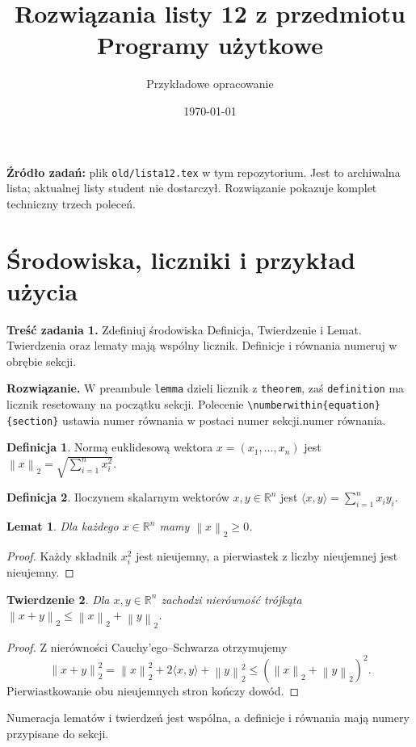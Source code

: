 \documentclass[11pt,a4paper]{article}
\title{Rozwiązania listy 12 z przedmiotu Programy użytkowe}
\author{Przykładowe opracowanie}
\date{\today}
\newtheorem{theorem}{Twierdzenie}
\newtheorem{lemma}[theorem]{Lemat}
\theoremstyle{definition}
\newtheorem{definition}{Definicja}[section]
\numberwithin{equation}{section}
\newcommand{\norm}[1]{\left\lVert #1\right\rVert}
\begin{document}
\maketitle
\noindent\textbf{Źródło zadań:} plik \texttt{old/lista12.tex} w tym
repozytorium. Jest to archiwalna lista; aktualnej listy student nie
dostarczył. Rozwiązanie pokazuje komplet techniczny trzech poleceń.

\section{Środowiska, liczniki i przykład użycia}
\noindent\textbf{Treść zadania 1.} Zdefiniuj środowiska Definicja,
Twierdzenie i Lemat. Twierdzenia oraz lematy mają wspólny licznik.
Definicje i równania numeruj w obrębie sekcji.

\medskip
\noindent\textbf{Rozwiązanie.} W preambule \texttt{lemma} dzieli licznik
z \texttt{theorem}, zaś \texttt{definition} ma licznik resetowany
na początku sekcji. Polecenie \verb|\numberwithin{equation}{section}|
ustawia numer równania w postaci numer sekcji.numer równania.
\begin{definition}
Normą euklidesową wektora $x=(x_1,\ldots,x_n)$ jest
$\norm{x}_2=\sqrt{\sum_{i=1}^{n}x_i^2}$.
\end{definition}
\begin{definition}
Iloczynem skalarnym wektorów $x,y\in\mathbb R^n$ jest
$\langle x,y\rangle=\sum_{i=1}^{n}x_i y_i$.
\end{definition}
\begin{lemma}
Dla każdego $x\in\mathbb R^n$ mamy $\norm{x}_2\geq 0$.
\end{lemma}
\begin{proof}
Każdy składnik $x_i^2$ jest nieujemny, a pierwiastek
z liczby nieujemnej jest nieujemny.
\end{proof}
\begin{theorem}
Dla $x,y\in\mathbb R^n$ zachodzi nierówność trójkąta
$\norm{x+y}_2\leq\norm{x}_2+\norm{y}_2$.
\end{theorem}
\begin{proof}
Z nierówności Cauchy'ego--Schwarza otrzymujemy
\begin{equation}
\norm{x+y}_2^2
=\norm{x}_2^2+2\langle x,y\rangle+\norm{y}_2^2
\leq(\norm{x}_2+\norm{y}_2)^2.
\end{equation}
Pierwiastkowanie obu nieujemnych stron kończy dowód.
\end{proof}
Numeracja lematów i twierdzeń jest wspólna, a definicje i równania
mają numery przypisane do sekcji.
\end{document}
